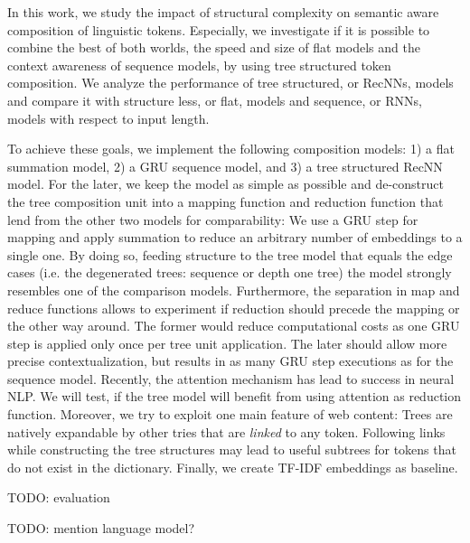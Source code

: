 In this work, we study the impact of structural complexity on semantic aware composition of linguistic tokens. Especially, we investigate if it is possible to combine the best of both worlds, the speed and size of flat models and the context awareness of sequence models, by using tree structured token composition. We analyze the performance of tree structured, or \acp{RecNN}, models and compare it with structure less, or flat, models and sequence, or \acp{RNN}, models with respect to input length.

To achieve these goals, we implement the following composition models: 1) a flat summation model, 2) a \ac{GRU} sequence model, and 3) a tree structured \ac{RecNN} model. For the later, we keep the model as simple as possible and de-construct the tree composition unit into a mapping function and reduction function that lend from the other two models for comparability: We use a \ac{GRU} step for mapping and apply summation to reduce an arbitrary number of embeddings to a single one. By doing so, feeding structure to the tree model that equals the edge cases (i.e. the degenerated trees: sequence or depth one tree) the model strongly resembles one of the comparison models. Furthermore, the separation in map and reduce functions allows to experiment if reduction should precede the mapping or the other way around. The former would reduce computational costs as one \ac{GRU} step is applied only once per tree unit application. The later should allow more precise contextualization, but results in as many \ac{GRU} step executions as for the sequence model. Recently, the attention mechanism  has lead to success in neural \ac{NLP}. We will test, if the tree model will benefit from using attention as reduction function. Moreover, we try to exploit one main feature of web content: Trees are natively expandable by other tries that are \textit{linked} to any token. Following links while constructing the tree structures may lead to useful subtrees for tokens that do not exist in the dictionary. Finally, we create \ac{TF-IDF} embeddings as baseline.   

TODO: evaluation

TODO: mention language model?





